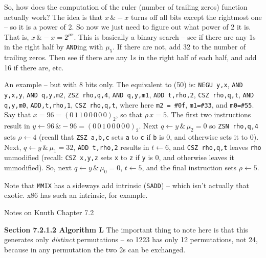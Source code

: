 \vskip 0.08in \noindent [p 141] So, how does the computation
of the ruler (number of trailing zeros) function actually work?  The idea
is that $x\, \& -x$ turns off all bits except the rightmost one --
so it is a power of 2.  So now we just need to figure
out what power of 2 it is.  That is, $x\, \& -x = 2^{\rho x}$.
This is basically a binary search -- see if there are any 1s
in the right half by {\tt AND}ing with $\mu_5$.  If there are not,
add 32 to the number of trailing zeros.  Then see if there are any
1s in the right half of each half, and add 16 if there are, etc.

An example -- but with 8 bits only.  The equivalent to (50)
is: {\tt NEGU y,x}, {\tt AND y,x,y}, {\tt AND q,y,m2}, {\tt ZSZ rho,q,4},
{\tt AND q,y,m1}, {\tt ADD t,rho,2}, {\tt CSZ rho,q,t},
{\tt AND q,y,m0}, {\tt ADD,t,rho,1}, {\tt CSZ rho,q,t},
where here {\tt m2 = \#0f}, {\tt m1=\#33}, and {\tt m0=\#55}.
Say that $x = 96 = \left(0\,1\,1\,0\,0\,0\,0\,0\right)_2$,
so that $\rho\,x = 5$.  The first two instructions result in
$y \gets 96\, \& -96 = \left(0\,0\,1\,0\,0\,0\,0\,0\right)_2$.
Next $q \gets y\, \& \,\mu_2 = 0$ so {\tt ZSN rho,q,4} sets $\rho \gets 4$
(recall that {\tt ZSZ a,b,c} sets {\tt a} to {\tt c} if {\tt b} is 0, and
otherwise sets it to 0).  Next, $q \gets y\, \& \,\mu_1 = 32$, {\tt ADD t,rho,2} 
results in $t \gets 6$, and {\tt CSZ rho,q,t} leaves {\tt rho} unmodified
(recall: {\tt CSZ x,y,z} sets {\tt x} to {\tt z} if {\tt y} is 0, and otherwise
leaves it unmodified).  So, next $q \gets y\, \& \, \mu_0 = 0$,
$t \gets 5$, and the final instruction sets $\rho \gets 5$.

\vskip 0.1in 

\noindent [p 143] Note that {\tt MMIX} has a sideways add intrinsic
({\tt SADD}) -- which isn't actually that exotic.  x86 has such an intrinsic,
for example.

\vfil\break
\topglue 0.5in
\centerline{Notes on Knuth Chapter 7.2}
\vskip 0.5in

\noindent
{\bf Section 7.2.1.2 Algorithm L} The important thing to note here is that
this generates only {\it distinct} permutations -- so 1223 has only 12
permutations, not 24, because in any permutation the two 2s can be
exchanged.

